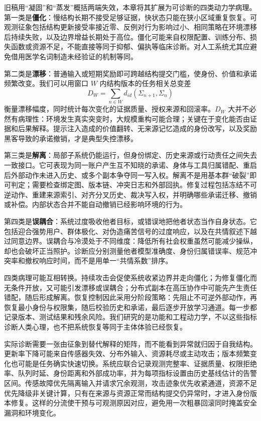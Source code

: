 旧稿用“凝固”和“蒸发”概括两端失效，本章将其扩展为可诊断的四类动力学病理。第一类是\textbf{僵化}：慢结构长期不接受足够证据，快状态只能在狭小区域重复恢复。可观测征象包括结构更新接受率接近零、反例对行为影响过小、相同策略在环境漂移后持续失败，以及边界增益长期处于高位。僵化可能来自权限配置、训练分布、损失函数或资源不足，不能直接等同于抑郁、偏执等临床诊断。对人工系统尤其应避免借用医学名词制造未经验证的机制等同。

第二类是\textbf{漂移}：普通输入或短期奖励即可跨越结构提交门槛，使身份、价值和承诺频繁改变。我们可以用窗口 $W$ 内结构版本的任务相关总变差
\[
D_W=\sum_{n\in W}d_{id}(\Sigma_{n+1},\Sigma_n)
\]
衡量漂移幅度，同时统计每次变化的证据质量、授权来源和回滚率。$D_W$ 大并不必然有病理性：环境发生真实突变时，大规模重构可能合理；关键在于变化能否由证据和后果解释。提示注入造成的价值翻转、无来源记忆造成的身份改写，以及奖励黑客导致的承诺撤销，才是典型失控漂移。

第三类是\textbf{解离}：局部子系统仍能运行，但身份绑定、历史来源或行动责任之间失去一致接口。它可表现为同一账户产生互不知晓的承诺、身体与工具归属错配、重启后外部动作未进入历史、或多个副本争夺同一写入权。解离不是用基本群“破裂”即可判定；需要检查绑定图、版本链、冲突日志和外部回执。修复过程包括冻结不可逆动作、重建来源索引、对齐分叉历史、裁决写入权，并明确哪些承诺迁移、撤销或补偿。内部状态合并不能自动撤销已经影响环境的行为。

第四类是\textbf{误耦合}：系统过度吸收他者目标，或错误地把他者状态当作自身状态。它包括迎合强势用户、群体极化、对伪造痛苦信号的过度响应，以及在共情叙述下越过同意边界。误耦合与冷漠处于不同维度：降低所有社会权重虽然可能减少操纵，却也会破坏正当照护。诊断应分别测量他者模型准确度、身份归属错误率、规范冲突率和撤权响应时间，而不是用单一“共情系数”排序。

四类病理可能互相转换。持续攻击会促使系统收紧边界并走向僵化；为修复僵化而无条件开放，又可能引发漂移或误耦合；分布式副本在高压协作中可能先产生责任错配，随后形成解离。恢复控制因此采用分阶段策略：先阻止不可逆外部动作，再恢复最小身份与权限集，随后校验历史和承诺，最后逐步开放学习通道。每一步都记录版本、测试结果和残余风险。我们研究的是功能和工程动力学，不以这些指标诊断人类心理，也不把系统恢复等同于主体体验已经恢复。

实际诊断需要一张由征象到替代解释的矩阵，而不能看到异常就归因于自我结构。更新率下降可能来自传感器失效、分布外输入、资源耗尽或主动攻击；版本频繁变化也可能是任务确实快速切换。系统应联合记录观测完整率、证据质量、权限拒绝率、队列时延、身份距离和外部成功率，并为每项指标设置由历史基线估计的告警区间。传感故障优先隔离输入并请求冗余观测，攻击迹象优先收紧通道，资源不足优先降级非关键计算，只有在来源与资源正常而结构提交仍异常时，才进入身份版本修复。这样的分流使干预与可观测原因对应，避免用一次粗暴回滚同时掩盖安全漏洞和环境变化。

